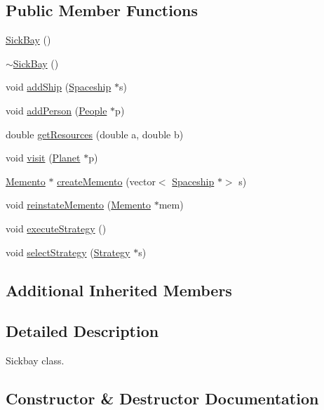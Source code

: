 \subsection*{Public Member Functions}
\begin{DoxyCompactItemize}
\item 
\hyperlink{classSickBay_a6deba7260251b077d29cabb75587f9c6}{Sick\+Bay} ()
\item 
\hyperlink{classSickBay_a527219ede6b1a75938fef90ecc0b7755}{$\sim$\+Sick\+Bay} ()
\item 
void \hyperlink{classSickBay_aa70415a7714cdd88553f3694b3f2e9e1}{add\+Ship} (\hyperlink{classSpaceship}{Spaceship} $\ast$s)
\item 
void \hyperlink{classSickBay_a3934a1b821fbd192a946a9aff4575afa}{add\+Person} (\hyperlink{classPeople}{People} $\ast$p)
\item 
double \hyperlink{classSickBay_ab14fde02df1e95c352ba51d59480c3fa}{get\+Resources} (double a, double b)
\item 
void \hyperlink{classSickBay_a4f8395f68f93b62e0cc68f6a3bd3af79}{visit} (\hyperlink{classPlanet}{Planet} $\ast$p)
\item 
\hyperlink{classMemento}{Memento} $\ast$ \hyperlink{classSickBay_a0d06ca126941dae25aaf74838dd1914b}{create\+Memento} (vector$<$ \hyperlink{classSpaceship}{Spaceship} $\ast$$>$ s)
\item 
void \hyperlink{classSickBay_a1b2156dee5ed14c68c3f25ee3a53e9c8}{reinstate\+Memento} (\hyperlink{classMemento}{Memento} $\ast$mem)
\item 
void \hyperlink{classSickBay_af053a3507f8246fd1577124644cf7477}{execute\+Strategy} ()
\item 
void \hyperlink{classSickBay_ac25920ac3e757e289ea25233991fa94e}{select\+Strategy} (\hyperlink{classStrategy}{Strategy} $\ast$s)
\end{DoxyCompactItemize}
\subsection*{Additional Inherited Members}


\subsection{Detailed Description}
Sickbay class. 

\subsection{Constructor \& Destructor Documentation}
\mbox{\label{classSickBay_a6deba7260251b077d29cabb75587f9c6}} 
